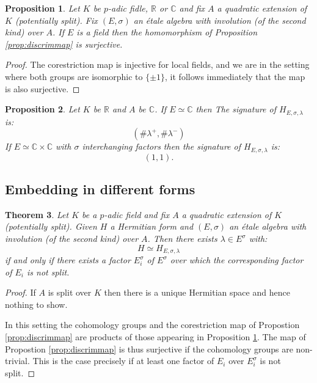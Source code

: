 \documentclass{article}
\theoremstyle{plain}
\newtheorem{theorem}{Theorem}[section]
\newtheorem{proposition}[theorem]{Proposition}
\theoremstyle{definition}
\numberwithin{equation}{section}
\newcommand{\RR}{\mathbb{R}}
\newcommand{\CC}{\mathbb{C}}
\begin{document}
\begin{proposition}\label{prop:discrimmapsurjective}
Let $K$ be $p$-adic fidle, $\RR$ or $\CC$ and fix $A$ a quadratic extension of $K$ (potentially split).
Fix $(E,\sigma)$ an \'etale algebra with involution (of the second kind) over $A$.
If $E$ is a field then the homomorphism of Proposition \ref{prop:discrimmap} is surjective.
\end{proposition}
\begin{proof}
The corestriction map is injective for local fields, and we are in the setting where both groups are isomorphic to $\{\pm1\}$, it follows immediately that the map is also surjective.
\end{proof}

\begin{proposition}\label{prop:signature}
Let $K$ be $\RR$ and $A$ be $\CC$.
If $E \simeq \CC$ then
The signature of $H_{E,\sigma,\lambda}$ is:
\[ (\#\lambda^+,\#\lambda^-) \]
If $E\simeq \CC\times\CC$ with $\sigma$ interchanging factors then the signature of $H_{E,\sigma,\lambda}$ is:
\[ (1,1). \]
\end{proposition}

\subsection{Embedding in different forms}

\begin{theorem}
Let $K$ be a $p$-adic field and fix $A$ a quadratic extension of $K$ (potentially split).
Given $H$ a Hermitian form and $(E,\sigma)$ an \'etale algebra with involution (of the second kind) over $A$. Then there exists $\lambda \in E^\sigma$ with:
\[ H \simeq H_{E,\sigma,\lambda} \]
if and only if there exists a factor $E_i^\sigma$ of $E^\sigma$ over which the corresponding factor of $E_i$ is not split.
\end{theorem}
\begin{proof}
If $A$ is split over $K$ then there is a unique Hermitian space and hence nothing to show.

In this setting the cohomology groups and the corestriction map of Propostion \ref{prop:discrimmap} are products of those appearing in Proposition \ref{prop:discrimmapsurjective}. The map of Propostion \ref{prop:discrimmap} is thus surjective if the cohomology groups are non-trivial. This is the case precisely if at least one factor of $E_i$ over $E_i^\sigma$ is not split.
\end{proof}
\end{document}
